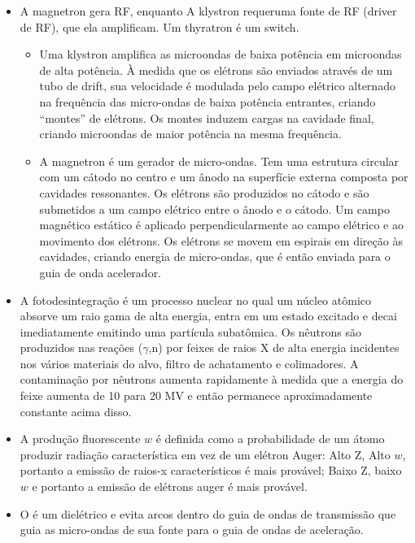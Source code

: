 \documentclass[11pt,a4paper]{article}
\newcounter{exemplo}
\begin{document}
\begin{exemplo}[Física]
\begin{itemize}
        \item A magnetron gera RF, enquanto A klystron requeruma fonte de RF (driver de RF), que ela amplificam. Um thyratron é um switch.
        
            \begin{itemize}
                \item Uma klystron amplifica as microondas de baixa potência em microondas de alta potência. À medida que os elétrons são enviados através de um tubo de drift, sua velocidade é modulada pelo campo elétrico alternado na frequência das micro-ondas de baixa potência entrantes, criando “montes” de elétrons. Os montes induzem cargas na cavidade final, criando microondas de maior potência na mesma frequência.
                
                \item A magnetron é um gerador de micro-ondas. Tem uma estrutura circular com um cátodo no centro e um ânodo na superfície externa composta por cavidades ressonantes. Os elétrons são produzidos no cátodo e são submetidos a um campo elétrico entre o ânodo e o cátodo. Um campo magnético estático é aplicado perpendicularmente ao campo elétrico e ao movimento dos elétrons. Os elétrons se movem em espirais em direção às cavidades, criando energia de micro-ondas, que é então enviada para o guia de onda acelerador.
            \end{itemize}
        
        \item A fotodesintegração é um processo nuclear no qual um núcleo atômico absorve um raio gama de alta energia, entra em um estado excitado e decai imediatamente emitindo uma partícula subatômica. Os nêutrons são produzidos nas reações ($\gamma$,n) por feixes de raios X de alta energia incidentes nos vários materiais do alvo, filtro de achatamento e colimadores. A contaminação por nêutrons aumenta rapidamente à medida que a energia do feixe aumenta de 10 para 20 MV e então permanece aproximadamente constante acima disso.
        
        \item A produção fluorescente $w$ é definida como a probabilidade de um átomo produzir radiação característica em vez de um elétron Auger: Alto Z, Alto $w$, portanto a emissão de raios-x característicos é mais provável; Baixo Z, baixo $w$ e portanto a emissão de elétrons auger é mais provável. 
        
        \item O  é um dielétrico e evita arcos dentro do guia de ondas de transmissão que guia as micro-ondas de sua fonte para o guia de ondas de aceleração.
        

\end{itemize}
\end{exemplo}
\end{document}
